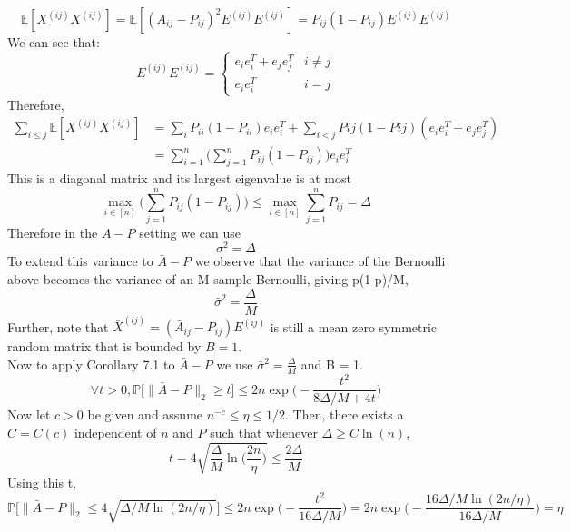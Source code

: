 \documentclass[10pt]{article}
\begin{document}
\begin{equation*}
\mathbb{E}[X^{(ij)}X^{(ij)}] = \mathbb{E} [(A_{ij} - P_{ij})^2E^{(ij)}E^{(ij)}] = P_{ij}(1-P_{ij})E^{(ij)}E^{(ij)}
\end{equation*}
We can see that:
\begin{equation*}
E^{(ij)}E^{(ij)} = 
\left\{
\begin{array}{ll}
e_ie_i^T + e_je_j^T  &  i\neq j \\
e_ie_i^T & i = j
\end{array}
\right.
\end{equation*}
Therefore,
\begin{align*}
\sum_{i\leq j}^{}\mathbb{E}[X^{(ij)}X^{(ij)}] &= \sum_{i}^{}P_{ii}(1-P_{ii})e_ie_i^T + \sum_{i<j}^{}P{ij}(1-P{ij})(e_ie_i^T +e_je_j^T)\\
&= \sum_{i=1}^{n}\Big(\sum_{j=1}^{n}P_{ij}(1-P_{ij})\Big)e_ie_i^T
\end{align*}
This is a diagonal matrix and its largest eigenvalue is at most
\begin{equation*}
\max_{i\in [n]} \Big(\sum_{j=1}^{n}P_{ij}(1-P_{ij})\Big) \leq \max_{i\in [n]}\sum_{j=1}^{n}P_{ij} = \Delta
\end{equation*}
Therefore in the $A-P$ setting we can use
\begin{equation*}
\sigma^2 = \Delta
\end{equation*}
To extend this variance to $\bar{A}-P$ we observe that the variance of the Bernoulli above becomes the variance of an M sample Bernoulli, giving p(1-p)/M,
\begin{equation*}
\bar{\sigma}^2 = \frac{\Delta}{M}
\end{equation*}
Further, note that $\bar{X}^{(ij)} = (\bar{A}_{ij}-P_{ij})E^{(ij)}$ is still a mean zero symmetric random matrix that is bounded by $B=1$.\\
Now to apply Corollary 7.1 to  $\bar{A}-P$ we use $\bar{\sigma}^2 = \frac{\Delta}{M}$ and B = 1.
\begin{equation*}
\forall t > 0, \mathbb{P}\Big[\|\bar{A}-P\|_2 \geq t\Big] \leq 2n\exp\Big(-\frac{t^2}{8\Delta/M + 4t}\Big)
\end{equation*}
Now let $c>0$ be given and assume $n^{-c} \leq \eta \leq 1/2$. Then, there exists a $ C= C(c)$ independent of $n$ and $P$ such that whenever $\Delta \geq C\ln(n)$,
\begin{equation*}
t = 4\sqrt{\frac{\Delta}{M}\ln\Big(\frac{2n}{\eta}\Big)} \leq \frac{2\Delta}{M}
\end{equation*}
Using this t,
\begin{equation*}
\mathbb{P}\Big[ \|\bar{A}-P\|_2 \leq 4\sqrt{\Delta/M\ln(2n/\eta)}\Big] \leq 2n\exp\Big(-\frac{t^2}{16\Delta/M}\Big) = 2n\exp\Big(-\frac{16\Delta/M \ln(2n/\eta)}{16\Delta/M}\Big) = \eta
\end{equation*}
\end{document}
